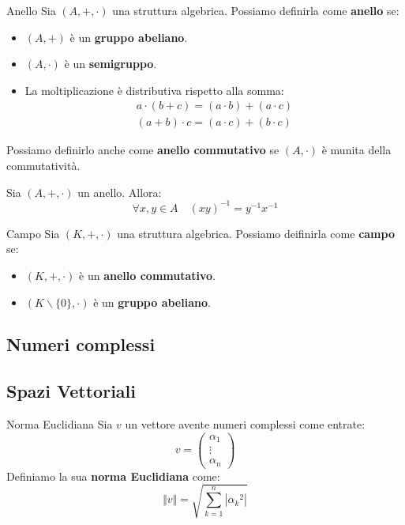 \begin{definition}{Anello}{}
    Sia $(A,+,\cdot)$ una struttura algebrica. Possiamo definirla come \textbf{anello} se:
    \begin{itemize}
        \item $(A,+)$ è un \textbf{gruppo abeliano}.
        \item $(A,\cdot)$ è un \textbf{semigruppo}.
        \item La moltiplicazione è distributiva rispetto alla somma:
        \begin{equation*}
            \begin{split}
                a \cdot (b + c) = (a \cdot b) + (a \cdot c) \\
                (a + b) \cdot c= (a \cdot c) + (b \cdot c)   
            \end{split}
        \end{equation*}
    \end{itemize}
    Possiamo definirlo anche come \textbf{anello commutativo} se $(A,\cdot)$ è munita della commutatività.
\end{definition}
\begin{fact}{}{}
    Sia $(A,+,\cdot)$ un anello. Allora:
    \begin{equation*}
        \forall x,y\in A \quad (xy)^{-1} = y^{-1}x^{-1}
    \end{equation*}
\end{fact}
\begin{definition}{Campo}{}
    Sia $(K,+,\cdot)$ una struttura algebrica. Possiamo deifinirla come \textbf{campo} se:
    \begin{itemize}
        \item $(K,+,\cdot)$ è un \textbf{anello commutativo}.
        \item $(K \backslash \{0\},\cdot)$ è un \textbf{gruppo abeliano}.
    \end{itemize}
\end{definition}

\subsection{Numeri complessi}
\subsection{Spazi Vettoriali}
\begin{definition}{Norma Euclidiana}{}
    Sia $v$ un vettore avente numeri complessi come entrate:
    \begin{equation*}
        v = \left(
        \begin{array}{c}
             \alpha_1  \\
             \vdots \\
            \alpha_n   
        \end{array}\right)
    \end{equation*}
    Definiamo la sua \textbf{norma Euclidiana} come:
    \begin{equation}
        \Vert v \Vert = \sqrt{\sum_{k=1}^{n} |{\alpha_k}^2|}
    \end{equation}
\end{definition}
